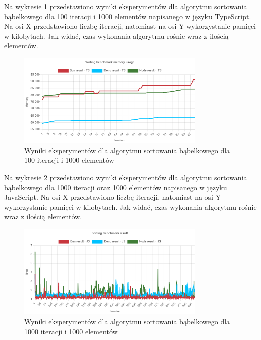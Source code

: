 Na wykresie \ref{fig:bubble_sorting_e2_memory_ts} przedstawiono wyniki eksperymentów dla algorytmu sortowania bąbelkowego dla 100 iteracji i 1000 elementów napisanego w języku TypeScript. Na osi X przedstawiono liczbę iteracji, natomiast na osi Y wykorzystanie pamięci w kilobytach. Jak widać, czas wykonania algorytmu rośnie wraz z ilością elementów.
\begin{figure}[H]
  \centering
  \includegraphics[width=0.8\textwidth]{Figures/sorting/bubble/e2_memory_ts.png}
  \caption{Wyniki eksperymentów dla algorytmu sortowania bąbelkowego dla 100 iteracji i 1000 elementów}
  \label{fig:bubble_sorting_e2_memory_ts}
\end{figure}

Na wykresie \ref{fig:bubble_sorting_e3} przedstawiono wyniki eksperymentów dla algorytmu sortowania bąbelkowego dla 1000 iteracji oraz 1000 elementów napisanego w języku JavaScript. Na osi X przedstawiono liczbę iteracji, natomiast na osi Y wykorzystanie pamięci w kilobytach. Jak widać, czas wykonania algorytmu rośnie wraz z ilością elementów.
\begin{figure}[H]
  \centering
  \includegraphics[width=0.8\textwidth]{Figures/sorting/bubble/e3_js.png}
  \caption{Wyniki eksperymentów dla algorytmu sortowania bąbelkowego dla 1000 iteracji i 1000 elementów}
  \label{fig:bubble_sorting_e3}
\end{figure}

